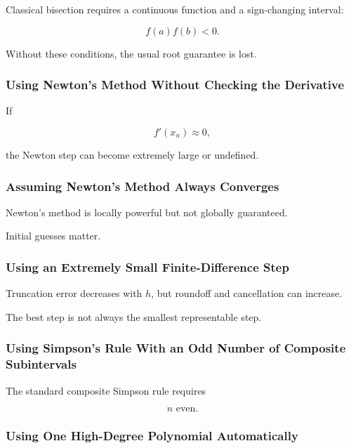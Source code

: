 Classical bisection requires a continuous function and a sign-changing
interval:

\[
\boxed{
f(a)f(b)<0.
}
\]

Without these conditions, the usual root guarantee is lost.

\subsubsection{Using Newton's Method Without Checking the Derivative}

If

\[
f'(x_n)
\approx0,
\]

the Newton step can become extremely large or undefined.

\subsubsection{Assuming Newton's Method Always Converges}

Newton's method is locally powerful but not globally guaranteed.

Initial guesses matter.

\subsubsection{Using an Extremely Small Finite-Difference Step}

Truncation error decreases with \(h\), but roundoff and cancellation can
increase.

The best step is not always the smallest representable step.

\subsubsection{Using Simpson's Rule With an Odd Number of Composite Subintervals}

The standard composite Simpson rule requires

\[
\boxed{
n
\text{ even}.
}
\]

\subsubsection{Using One High-Degree Polynomial Automatically}

